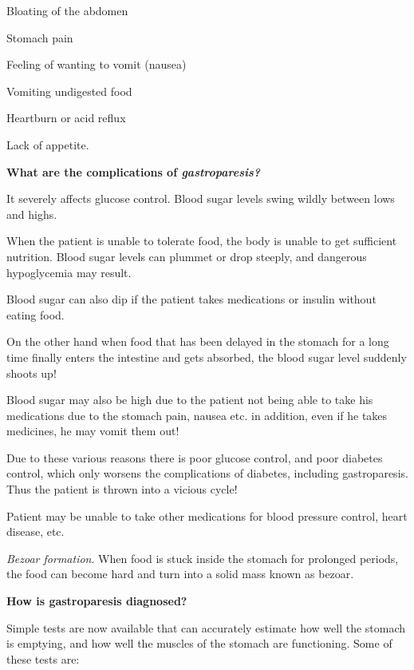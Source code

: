 { \item Bloating of the abdomen

 \item Stomach pain

 \item Feeling of wanting to vomit (nausea)

 \item Vomiting undigested food

 \item Heartburn or acid reflux

 \item Lack of appetite.

\textbf{What are the complications of \textit{gastroparesis?}}

\item 
 It severely affects glucose control. Blood sugar levels swing wildly between lows and highs.

 When the patient is unable to tolerate food, the body is unable to get sufficient nutrition. Blood sugar levels can plummet or drop steeply, and dangerous hypoglycemia may result.

 Blood sugar can also dip if the patient takes medications or insulin without eating food.

 On the other hand when food that has been delayed in the stomach for a long time finally enters the intestine and gets absorbed, the blood sugar level suddenly shoots up!

 Blood sugar may also be high due to the patient not being able to take his medications due to the stomach pain, nausea etc. in addition, even if he takes medicines, he may vomit them out!

 Due to these various reasons there is poor glucose control, and poor diabetes control, which only worsens the complications of diabetes, including gastroparesis. Thus the patient is thrown into a vicious cycle!

 \item Patient may be unable to take other medications for blood pressure control, heart disease, etc.

 \item \textit{Bezoar formation}. When food is stuck inside the stomach for prolonged periods, the food can become hard and turn into a solid mass known as bezoar.

\textbf{How is gastroparesis diagnosed?}

Simple tests are now available that can accurately estimate how well the stomach is emptying, and how well the muscles of the stomach are functioning. Some of these tests are:

}
